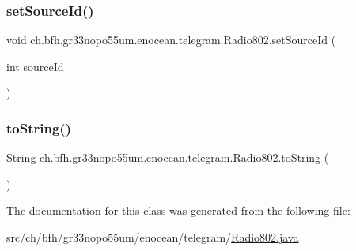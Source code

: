 \subsubsection{\texorpdfstring{set\+Source\+Id()}{setSourceId()}}
{\footnotesize\ttfamily void ch.\+bfh.\+gr33nopo55um.\+enocean.\+telegram.\+Radio802.\+set\+Source\+Id (\begin{DoxyParamCaption}\item[{int}]{source\+Id }\end{DoxyParamCaption})}

\hypertarget{classch_1_1bfh_1_1gr33nopo55um_1_1enocean_1_1telegram_1_1_radio802_a7861ad2051e04fe165d9a18e334e86ff}{}\label{classch_1_1bfh_1_1gr33nopo55um_1_1enocean_1_1telegram_1_1_radio802_a7861ad2051e04fe165d9a18e334e86ff} 
\subsubsection{\texorpdfstring{to\+String()}{toString()}}
{\footnotesize\ttfamily String ch.\+bfh.\+gr33nopo55um.\+enocean.\+telegram.\+Radio802.\+to\+String (\begin{DoxyParamCaption}{ }\end{DoxyParamCaption})}



The documentation for this class was generated from the following file\+:\begin{DoxyCompactItemize}
\item 
src/ch/bfh/gr33nopo55um/enocean/telegram/\hyperlink{_radio802_8java}{Radio802.\+java}\end{DoxyCompactItemize}
